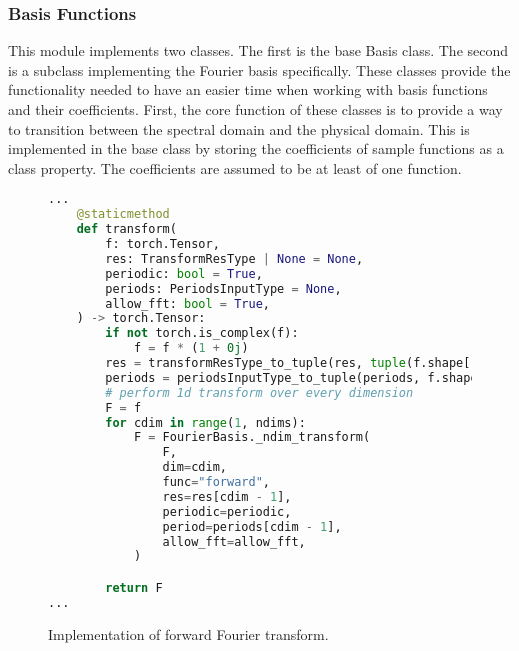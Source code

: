 \subsubsection{Basis Functions}

\noindent This module implements two classes. The first is the base Basis class. The second is a subclass implementing the Fourier basis specifically. These classes provide the functionality needed to have an easier time when working with basis functions and their coefficients. First, the core function of these classes is to provide a way to transition between the spectral domain and the physical domain. This is implemented in the base class by storing the coefficients of sample functions as a class property. The coefficients are assumed to be at least of one function.

\begin{figure}[H]
  \centering
  \begin{lstlisting}[language=Python]
...
    @staticmethod
    def transform(
        f: torch.Tensor,
        res: TransformResType | None = None,
        periodic: bool = True,
        periods: PeriodsInputType = None,
        allow_fft: bool = True,
    ) -> torch.Tensor:
        if not torch.is_complex(f):
            f = f * (1 + 0j)
        res = transformResType_to_tuple(res, tuple(f.shape[1:]))
        periods = periodsInputType_to_tuple(periods, f.shape[1:])
        # perform 1d transform over every dimension
        F = f
        for cdim in range(1, ndims):
            F = FourierBasis._ndim_transform(
                F,
                dim=cdim,
                func="forward",
                res=res[cdim - 1],
                periodic=periodic,
                period=periods[cdim - 1],
                allow_fft=allow_fft,
            )

        return F
...
  \end{lstlisting}
  \caption{Implementation of forward Fourier transform.}\label{fig:fourier_transform_impl}
\end{figure}

